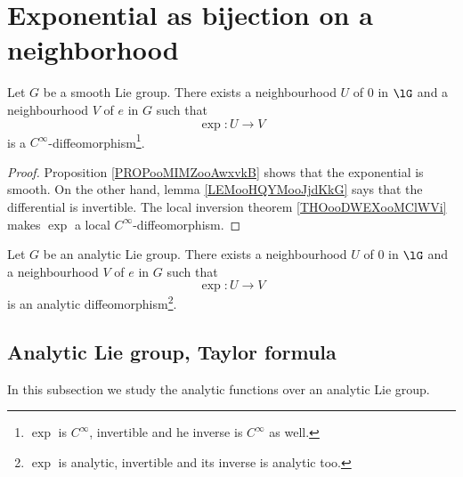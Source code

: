 \section{Exponential as bijection on a neighborhood}


\begin{proposition}     \label{PROPooYFZZooLUOuOj}
	Let \( G\) be a smooth Lie group. There exists a neighbourhood \( U\) of \( 0\) in \( \lG\) and a neighbourhood \( V\) of \( e\) in \( G\) such that
	\begin{equation}
		\exp\colon U\to V
	\end{equation}
	is a \(  C^{\infty}\)-diffeomorphism\footnote{\( \exp\) is \(  C^{\infty}\), invertible and he inverse is \(  C^{\infty}\) as well.}.
\end{proposition}

\begin{proof}
	Proposition \ref{PROPooMIMZooAwxvkB} shows that the exponential is smooth. On the other hand, lemma \ref{LEMooHQYMooJjdKkG} says that the differential is invertible. The local inversion theorem \ref{THOooDWEXooMClWVi} makes \( \exp\) a local \(  C^{\infty}\)-diffeomorphism.
\end{proof}

\begin{theorem}     \label{THOooFMFLooCnLJPr}
	Let \( G\) be an analytic Lie group. There exists a neighbourhood \( U\) of \( 0\) in \( \lG\) and a neighbourhood \( V\) of \( e\) in \( G\) such that
	\begin{equation}
		\exp\colon U\to V
	\end{equation}
	is an analytic diffeomorphism\footnote{\( \exp\) is analytic, invertible and its inverse is analytic too.}.
\end{theorem}

\subsection{Analytic Lie group, Taylor formula}

In this subsection we study the analytic functions over an analytic Lie group.

